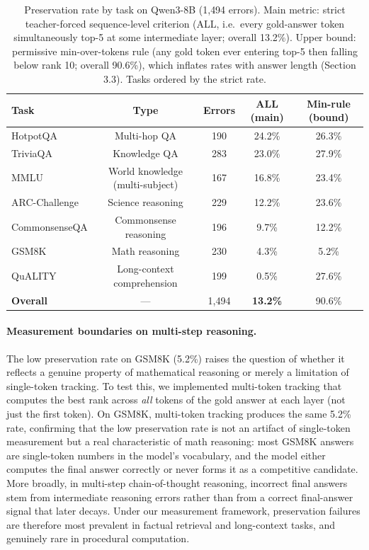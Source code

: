 \documentclass{article} %
\begin{document}
\begin{table}[t]
\centering
\caption{Preservation rate by task on Qwen3-8B (1{,}494 errors). Main metric: strict teacher-forced sequence-level criterion (ALL, i.e.\ every gold-answer token simultaneously top-5 at some intermediate layer; overall 13.2\%). Upper bound: permissive min-over-tokens rule (any gold token ever entering top-5 then falling below rank 10; overall 90.6\%), which inflates rates with answer length (Section 3.3). Tasks ordered by the strict rate.}
\label{tab:taskdecay}
\begin{tabular}{lcccc}
\toprule
\textbf{Task} & \textbf{Type} & \textbf{Errors} & \textbf{ALL (main)} & \textbf{Min-rule (bound)} \\
\midrule
HotpotQA & Multi-hop QA & 190 & 24.2\% & 26.3\% \\
TriviaQA & Knowledge QA & 283 & 23.0\% & 27.9\% \\
MMLU & World knowledge (multi-subject) & 167 & 16.8\% & 23.4\% \\
ARC-Challenge & Science reasoning & 229 & 12.2\% & 23.6\% \\
CommonsenseQA & Commonsense reasoning & 196 & 9.7\% & 12.2\% \\
GSM8K & Math reasoning & 230 & 4.3\% & 5.2\% \\
QuALITY & Long-context comprehension & 199 & 0.5\% & 27.6\% \\
\midrule
\textbf{Overall} & --- & 1{,}494 & \textbf{13.2\%} & 90.6\% \\
\bottomrule
\end{tabular}
\end{table}

\paragraph{Measurement boundaries on multi-step reasoning.}
The low preservation rate on GSM8K (5.2\%) raises the question of whether it reflects a genuine property of mathematical reasoning or merely a limitation of single-token tracking. To test this, we implemented multi-token tracking that computes the best rank across \emph{all} tokens of the gold answer at each layer (not just the first token). On GSM8K, multi-token tracking produces the same 5.2\% rate, confirming that the low preservation rate is not an artifact of single-token measurement but a real characteristic of math reasoning: most GSM8K answers are single-token numbers in the model's vocabulary, and the model either computes the final answer correctly or never forms it as a competitive candidate. More broadly, in multi-step chain-of-thought reasoning, incorrect final answers stem from intermediate reasoning errors rather than from a correct final-answer signal that later decays. Under our measurement framework, preservation failures are therefore most prevalent in factual retrieval and long-context tasks, and genuinely rare in procedural computation.
\end{document}
